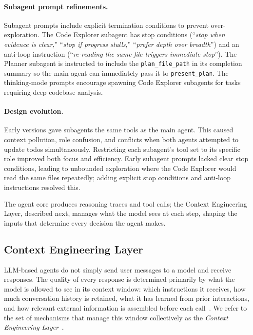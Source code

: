 \paragraph{Subagent prompt refinements.} Subagent prompts include explicit termination conditions to prevent over-exploration. The Code Explorer subagent has stop conditions (``\emph{stop when evidence is clear},'' ``\emph{stop if progress stalls},'' ``\emph{prefer depth over breadth}'') and an anti-loop instruction (``\emph{re-reading the same file triggers immediate stop}''). The Planner subagent is instructed to include the \texttt{plan\_file\_path} in its completion summary so the main agent can immediately pass it to \texttt{present\_plan}. The thinking-mode prompts encourage spawning Code Explorer subagents for tasks requiring deep codebase analysis.

\paragraph{Design evolution.} Early versions gave subagents the same tools as the main agent. This caused context pollution, role confusion, and conflicts when both agents attempted to update todos simultaneously. Restricting each subagent's tool set to its specific role improved both focus and efficiency. Early subagent prompts lacked clear stop conditions, leading to unbounded exploration where the Code Explorer would read the same files repeatedly; adding explicit stop conditions and anti-loop instructions resolved this.


The agent core produces reasoning traces and tool calls; the Context Engineering Layer, described next, manages what the model sees at each step, shaping the inputs that determine every decision the agent makes.

\subsection{Context Engineering Layer}
\label{sec:arch_context_engineering}

LLM-based agents do not simply send user messages to a model and receive responses. The quality of every response is determined primarily by what the model is allowed to see in its context window: which instructions it receives, how much conversation history is retained, what it has learned from prior interactions, and how relevant external information is assembled before each call~\cite{mei2025survey,hua2025context,ye2026meta}. We refer to the set of mechanisms that manage this window collectively as the \emph{Context Engineering Layer}~\cite{mei2025survey,hua2025context,ye2026meta}.

